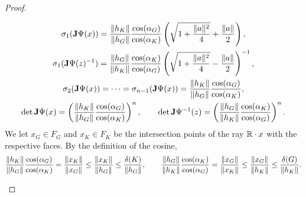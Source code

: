 \documentclass[10pt,a4paper]{article}
\begin{document}
\begin{proof}
\begin{itemize}
\begin{gather*}
            \sigma_{1}( {\mathbf{J}}\Psi(x) )
            = 
            \frac{ \| h_K \| }{ \| h_{{G}} \| }
            \frac{ \cos(\alpha_{{G}}) }{ \cos(\alpha_K) }
            \left( 
                \sqrt{ 1 + \frac{ \|a\|^{2} }{ 4 } } + \frac{ \|a\| }{2}
            \right)
            ,
            \\
            \sigma_{1}( {\mathbf{J}}\Psi(z)^{-1} )
            = 
            \frac{ \| h_{{G}} \| }{ \| h_K \| }
            \frac{ \cos(\alpha_K) }{ \cos(\alpha_{{G}}) }
            \left( 
                \sqrt{ 1 + \frac{ \|a\|^{2} }{ 4 } } - \frac{ \|a\| }{2}
            \right)^{-1},
            \\
            \sigma_{2}( {\mathbf{J}}\Psi(x) ) = \dots = \sigma_{n-1}( {\mathbf{J}}\Psi(x) )
            =
            \frac{ \| h_K \| }{ \| h_{{G}} \| }
            \frac{ \cos(\alpha_{{G}}) }{ \cos(\alpha_K) }
            ,
            \\
            \det{\mathbf{J}}\Psi(x)
            =
            \left( 
            \frac{ \| h_K \| }{ \| h_{{G}} \| }
            \frac{ \cos(\alpha_{{G}}) }{ \cos(\alpha_K) }
            \right)^{n},
            \qquad
            \det{\mathbf{J}}\Psi^{-1}(z)
            =
            \left( 
            \frac{ \| h_{{G}} \| }{ \| h_{K} \| }
            \frac{ \cos(\alpha_{K}) }{ \cos(\alpha_{{G}}) }
            \right)^{n}
            .
        \end{gather*}
        We let $x_{G} \in F_{G}$ and $x_{K} \in F_{K}$ be the intersection points of the ray ${\mathbb R} \cdot x$ with the respective faces.
        By the definition of the cosine, 
        \begin{align*}
            \frac{ \| h_K \| }{ \| h_{{G}} \| }
            \frac{ \cos(\alpha_{{G}}) }{ \cos(\alpha_K) }
            = 
            \frac{ \| x_K \| }{ \| x_{{G}} \| }
            \leq 
            \frac{ \| x_K \| }{ \| h_{{G}} \| }
            \leq 
            \frac{ {\delta}(K) }{ \| h_{{G}} \| }
            ,
            \qquad 
            \frac{ \| h_{{G}} \| }{ \| h_K \| }
            \frac{ \cos(\alpha_K) }{ \cos(\alpha_{{G}}) }
            = 
            \frac{ \| x_{G} \| }{ \| x_{K} \| }
            \leq 
            \frac{ \| x_{G} \| }{ \| h_{K} \| }
            \leq 
            \frac{ {\delta}(G) }{ \| h_{K} \| }
            .
        \end{align*}

\end{itemize}
\end{proof}
\end{document}
